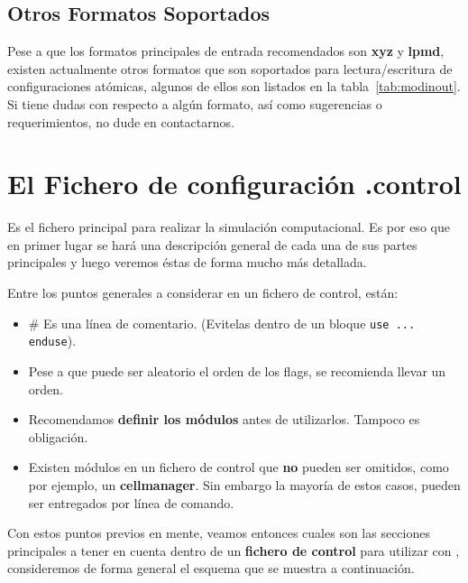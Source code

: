 \subsection{Otros Formatos Soportados}

Pese a que los formatos principales de entrada recomendados son \textbf{xyz} y \textbf{lpmd}, existen actualmente otros formatos que son soportados para lectura/escritura de configuraciones at\'omicas, algunos de ellos son listados en la tabla~\ref{tab:modinout}. Si tiene dudas con respecto a alg\'un formato, as\'i como sugerencias o requerimientos, no dude en contactarnos.

\section{El Fichero de configuraci\'on .control}

Es el fichero principal para realizar la simulaci\'on computacional. Es por eso que en primer lugar se har\'a una descripci\'on general de cada una de sus partes principales y luego veremos \'estas de forma mucho m\'as detallada.


Entre los puntos generales a considerar en un fichero de control, est\'an:

\begin{itemize}
 \item \# Es una l\'inea de comentario. (Evitelas dentro de un bloque \texttt{use ... enduse}).
 \item Pese a que puede ser aleatorio el orden de los flags, se recomienda llevar un orden.
 \item Recomendamos \textbf{definir los m\'odulos} antes de utilizarlos. Tampoco es obligaci\'on.
 \item Existen m\'odulos en un fichero de control que \textbf{no} pueden ser omitidos, como por ejemplo, un \textbf{cellmanager}. Sin embargo la mayor\'ia de estos casos, pueden ser entregados por l\'inea de comando.
\end{itemize}

Con estos puntos previos en mente, veamos entonces cuales son las secciones principales a tener en cuenta dentro de un \textbf{fichero de control} para utilizar con {\lpmd}, consideremos de forma general el esquema que se muestra a continuaci\'on.

